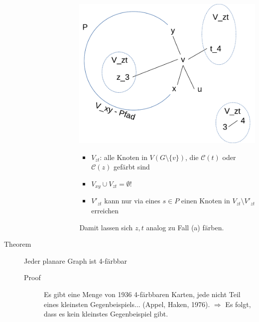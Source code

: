\begin{description}
\begin{description}
\begin{enumerate}
\begin{itemize}
\begin{enumerate}
                                    \includegraphics[scale=0.5]{lectures/161125/pix/3.pdf}
                                        \begin{itemize}
                                            \item $V_{zt}$: alle Knoten in $V(G \setminus \{v\})$, die $\mathcal{C}(t)$ oder $\mathcal{C}(z)$ gefärbt sind
                                            \item $V_{xy} \cup V_{zt} = \emptyset$!
                                            \item $V'_{zt}$ kann nur via eines $s \in P$ einen Knoten in $V_{zt} \setminus V'_{zt}$ erreichen
                                        \end{itemize}
                                        Damit lassen sich $z,t$ analog zu Fall (a) färben.
                                \end{enumerate}
                        \end{itemize}
                \end{enumerate}
        \end{description}
    \item[Theorem] Jeder planare Graph ist 4-färbbar
        \begin{description}
            \item[Proof] Es gibt eine Menge von 1936 4-färbbaren Karten, jede nicht Teil eines kleinsten Gegenbeispiels... (Appel, Haken, 1976).
            $\Rightarrow$ Es folgt, dass es kein kleinstes Gegenbeispiel gibt.
        \end{description}
\end{description}

